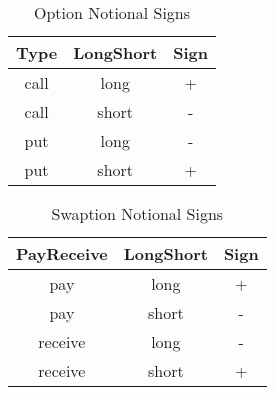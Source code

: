 \begin{table}[htpb]
	\begin{tabular}{| c| c| c|}
		\hline
		Type & LongShort & Sign \\ \hline
		call & long & + \\
		call & short & - \\
		\hline
		put & long & - \\
		put & short & + \\
		\hline
	\end{tabular}
	\caption{Option Notional Signs}
	\label{option_notional_signs}
\end{table}

\begin{table}[htpb]
	\begin{tabular}{| c| c| c|}
		\hline
		PayReceive & LongShort & Sign \\ \hline
		pay & long & + \\
		pay & short & - \\
		\hline
		receive & long & - \\
		receive & short & + \\
		\hline
	\end{tabular}
	\caption{Swaption Notional Signs}
	\label{swaption_notional_signs}
\end{table}